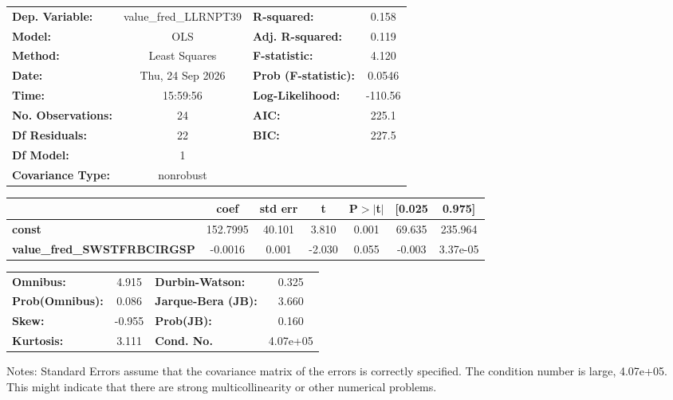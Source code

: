 \begin{center}
\begin{tabular}{lclc}
\toprule
\textbf{Dep. Variable:}             & value\_fred\_LLRNPT39 & \textbf{  R-squared:         } &     0.158   \\
\textbf{Model:}                     &          OLS          & \textbf{  Adj. R-squared:    } &     0.119   \\
\textbf{Method:}                    &     Least Squares     & \textbf{  F-statistic:       } &     4.120   \\
\textbf{Date:}                      &    Thu, 24 Sep 2026   & \textbf{  Prob (F-statistic):} &   0.0546    \\
\textbf{Time:}                      &        15:59:56       & \textbf{  Log-Likelihood:    } &   -110.56   \\
\textbf{No. Observations:}          &             24        & \textbf{  AIC:               } &     225.1   \\
\textbf{Df Residuals:}              &             22        & \textbf{  BIC:               } &     227.5   \\
\textbf{Df Model:}                  &              1        & \textbf{                     } &             \\
\textbf{Covariance Type:}           &       nonrobust       & \textbf{                     } &             \\
\bottomrule
\end{tabular}
\begin{tabular}{lcccccc}
                                    & \textbf{coef} & \textbf{std err} & \textbf{t} & \textbf{P$> |$t$|$} & \textbf{[0.025} & \textbf{0.975]}  \\
\midrule
\textbf{const}                      &     152.7995  &       40.101     &     3.810  &         0.001        &       69.635    &      235.964     \\
\textbf{value\_fred\_SWSTFRBCIRGSP} &      -0.0016  &        0.001     &    -2.030  &         0.055        &       -0.003    &     3.37e-05     \\
\bottomrule
\end{tabular}
\begin{tabular}{lclc}
\textbf{Omnibus:}       &  4.915 & \textbf{  Durbin-Watson:     } &    0.325  \\
\textbf{Prob(Omnibus):} &  0.086 & \textbf{  Jarque-Bera (JB):  } &    3.660  \\
\textbf{Skew:}          & -0.955 & \textbf{  Prob(JB):          } &    0.160  \\
\textbf{Kurtosis:}      &  3.111 & \textbf{  Cond. No.          } & 4.07e+05  \\
\bottomrule
\end{tabular}
\end{center}

Notes: \newline
 [1] Standard Errors assume that the covariance matrix of the errors is correctly specified. \newline
 [2] The condition number is large, 4.07e+05. This might indicate that there are \newline
 strong multicollinearity or other numerical problems.